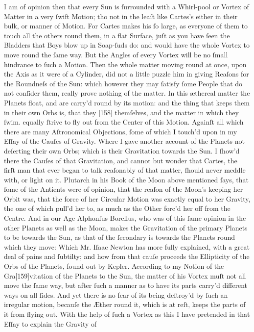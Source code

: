 \documentclass[letterpaper]{book}
\begin{document}
I am of opinion then that every Sun is ſurrounded with a Whirl-pool or
Vortex of Matter in a very ſwift Motion; tho not in the leaſt like Cartes's
either in their bulk, or manner of Motion. For Cartes makes his ſo large,
as everyone of them to touch all the others round them, in a flat Surface,
juſt as you have ſeen the Bladders that Boys blow up in Soap-ſuds do: and
would have the whole Vortex to move round the ſame way. But the Angles
of every Vortex will be no ſmall hindrance to ſuch a Motion. Then the whole
matter moving round at once, upon the Axis as it were of a Cylinder, did not
a little puzzle him in giving Reaſons for the Roundneſs of the Sun: which
however they may ſatisfy ſome People that do not conſider them, really
prove nothing of the matter. In this æthereal matter the Planets float, and
are carry'd round by its motion: and the thing that keeps them in their own
Orbs is, that they [158] themſelves, and the matter in which they ſwim.
equally ſtrive to fly out from the Center of this Motion. Againſt all which
there are many Aſtronomical Objections, ſome of which I touch'd upon in
my Eſſay of the Cauſes of Gravity. Where I gave another account of the
Planets not deſerting their own Orbs; which is their Gravitation towards
the Sun. I ſhow'd there the Cauſes of that Gravitation, and cannot but
wonder that Cartes, the firſt man that ever began to talk reaſonably of that
matter, ſhould never meddle with, or light on it. Plutarch in his Book of
the Moon above mentioned ſays, that ſome of the Antients were of opinion,
that the reaſon of the Moon's keeping her Orbit was, that the force of her
Circular Motion was exactly equal to her Gravity, the one of which pull'd
her to, as much as the Other forc'd her off from the Centre. And in our
Age Alphonſus Borellus, who was of this ſame opinion in the other Planets
as well as the Moon, makes the Gravitation of the primary Planets to be
towards the Sun, as that of the ſecondary is towards the Planets round
which they move: Which Mr. Iſaac Newton has more fully explained, with
a great deal of pains and ſubtilty; and how from that cauſe proceeds the
Ellipticity of the Orbs of the Planets, found out by Kepler. According to
my Notion of the Gra[159]vitation of the Planets to the Sun, the matter of
his Vortex muſt not all move the ſame way, but after ſuch a manner as to
have its parts carry'd different ways on all ſides. And yet there is no fear of
its being deſtroy'd by ſuch an irregular motion, becauſe the Æther round it,
which is at reſt, keeps the parts of it from flying out. With the help of ſuch
a Vortex as this I have pretended in that Eſſay to explain the Gravity of
\end{document}
